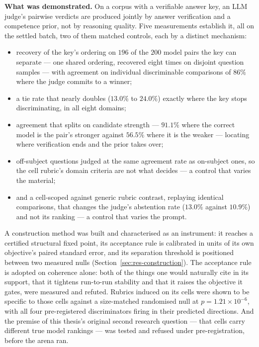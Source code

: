 \textbf{What was demonstrated.}
On a corpus with a verifiable answer key, an LLM judge's pairwise
verdicts are produced jointly by answer verification and a competence
prior, not by reasoning quality. Five
measurements establish it, all on the settled batch, two of them
matched controls, each by a distinct mechanism:
\begin{itemize}
\item recovery of the key's ordering on $196$ of the $200$ model pairs
the key can separate --- one shared ordering, recovered eight times on
disjoint question samples --- with agreement on individual
discriminable comparisons of $86\%$ where the judge commits to a
winner;
\item a tie rate that nearly doubles ($13.0\%$ to $24.0\%$) exactly
where the key stops discriminating, in all eight domains;
\item agreement that splits on candidate strength --- $91.1\%$ where
the correct model is the pair's stronger against $56.5\%$ where it is
the weaker --- locating where verification ends and the prior takes
over;
\item off-subject questions judged at the same agreement rate as
on-subject ones, so the cell rubric's domain criteria are not what
decides --- a control that varies the material;
\item and a cell-scoped against generic rubric contrast, replaying
identical comparisons, that changes the judge's abstention rate
($13.0\%$ against $10.9\%$) and not its ranking --- a control that
varies the prompt.
\end{itemize}
A construction method was built and characterised as an instrument: it
reaches a certified structural fixed point, its acceptance rule is
calibrated in units of its own objective's paired standard error, and
its separation threshold is positioned between two measured nulls
(Section~\ref{sec:res-construction}). The acceptance rule is adopted on
coherence alone: both of the things one would naturally cite in its
support, that it tightens run-to-run stability and that it raises the
objective it gates, were measured and refuted.
Rubrics induced on its cells were shown to be specific to those cells
against a size-matched randomised null at
$p = 1.21 \times 10^{-6}$, with all four pre-registered discriminators
firing in their predicted directions.
And the premise of this thesis's original second research question ---
that cells carry different true model rankings --- was tested and
refused under pre-registration, before the arena ran.

